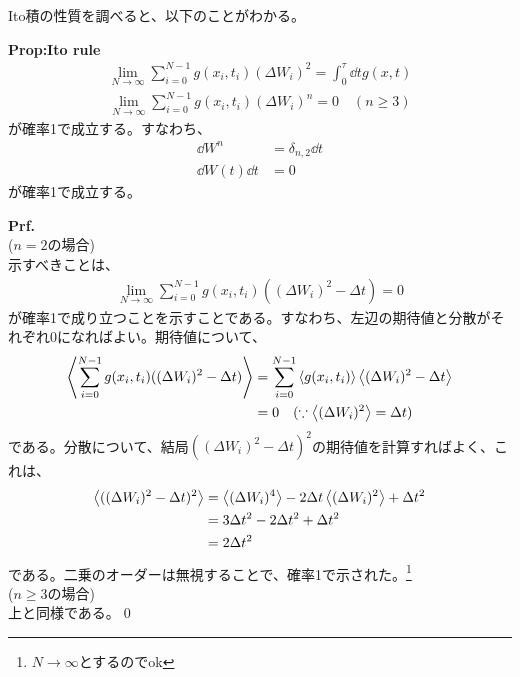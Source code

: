\documentclass[a4paper,11pt]{jsarticle}
\numberwithin{equation}{section}
\begin{document}
Ito積の性質を調べると、以下のことがわかる。
\begin{itembox}[l]{\textbf{Prop:Ito rule}}
  \begin{align}
    \lim_{N \to \infty}\sum_{i=0}^{N-1}g(x_i,t_i)(\Delta W_i)^2 = \int_0^\tau \dd{t}g(x,t)
  \end{align}
  \begin{align}
    \lim_{N \to \infty}\sum_{i=0}^{N-1}g(x_i,t_i)(\Delta W_i)^n = 0 \quad (n \geq 3)
  \end{align}
  が確率1で成立する。すなわち、
  \begin{align}
    \dd{W^n} &= \delta_{n,2} \dd{t}\\
    \dd{W(t)}\dd{t} &= 0
  \end{align}
  が確率1で成立する。
\end{itembox}
\textbf{Prf.}\\
($n=2$の場合)\\
示すべきことは、
\begin{align}
  \lim_{N \to \infty}\sum_{i=0}^{N-1}g(x_i,t_i)((\Delta W_i)^2 - \Delta t) = 0
\end{align}
が確率1で成り立つことを示すことである。すなわち、左辺の期待値と分散がそれぞれ0になればよい。期待値について、
\begin{align}
  \ev{\sum_{i=0}^{N-1}g(x_i,t_i)((\Delta W_i)^2 - \Delta t)} &= \sum_{i=0}^{N-1}\ev{g(x_i,t_i)}\ev{(\Delta W_i)^2 - \Delta t} \\
  &= 0 \quad (\because \ev{(\Delta W_i)^2 }= \Delta t)
\end{align}
である。分散について、結局$((\Delta W_i)^2-\Delta t)^2$の期待値を計算すればよく、これは、
\begin{align}
  \ev{((\Delta W_i)^2-\Delta t)^2} &= \ev{(\Delta W_i)^4} - 2\Delta t\ev{(\Delta W_i)^2} + \Delta t^2\\
  &= 3\Delta t^2 - 2\Delta t^2 + \Delta t^2\\
  &=2\Delta t^2
\end{align}
である。二乗のオーダーは無視することで、確率1で示された。\footnote{$N \to \infty$とするのでok}\\
($n \geq 3$の場合)\\
上と同様である。\qed\\
\end{document}
